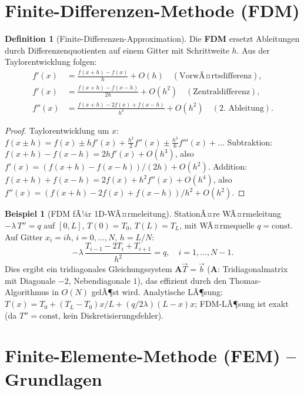 ﻿\documentclass[a4paper,12pt]{report}
\theoremstyle{definition}
\newtheorem{definition}{Definition}
\newtheorem{beispiel}{Beispiel}
\begin{document}

\section{Finite-Differenzen-Methode (FDM)}

\begin{definition}[Finite-Differenzen-Approximation]
Die \textbf{FDM} ersetzt Ableitungen durch Differenzenquotienten auf einem
Gitter mit Schrittweite $h$. Aus der Taylorentwicklung folgen:
\begin{align*}
  f'(x) &= \frac{f(x+h) - f(x)}{h} + O(h) \quad (\text{VorwÃ¤rtsdifferenz}),\\
  f'(x) &= \frac{f(x+h) - f(x-h)}{2h} + O(h^2) \quad (\text{Zentraldifferenz}),\\
  f''(x) &= \frac{f(x+h) - 2f(x) + f(x-h)}{h^2} + O(h^2) \quad (\text{2.\ Ableitung}).
\end{align*}
\end{definition}
\begin{proof}
Taylorentwicklung um $x$:
$f(x\pm h) = f(x) \pm hf'(x) + \tfrac{h^2}{2}f''(x) \pm \tfrac{h^3}{6}f'''(x) + \ldots$
Subtraktion: $f(x+h)-f(x-h) = 2hf'(x) + O(h^3)$, also $f'(x) = (f(x+h)-f(x-h))/(2h) + O(h^2)$.
Addition: $f(x+h)+f(x-h) = 2f(x) + h^2 f''(x) + O(h^4)$, also
$f''(x) = (f(x+h)-2f(x)+f(x-h))/h^2 + O(h^2)$.
\end{proof}

\begin{beispiel}[FDM fÃ¼r 1D-WÃ¤rmeleitung]
StationÃ¤re WÃ¤rmeleitung $-\lambda\,T'' = q$ auf $[0,L]$,
$T(0) = T_0$, $T(L) = T_L$, mit WÃ¤rmequelle $q = \mathrm{const}$.
Auf Gitter $x_i = ih$, $i = 0,\ldots,N$, $h = L/N$:
\[
  -\lambda\,\frac{T_{i-1} - 2T_i + T_{i+1}}{h^2} = q, \quad i = 1,\ldots,N-1.
\]
Dies ergibt ein tridiagonales Gleichungssystem $\mathbf{A}\vec{T} = \vec{b}$
($\mathbf{A}$: Tridiagonalmatrix mit Diagonale $-2$, Nebendiagonale $1$),
das effizient durch den Thomas-Algorithmus in $O(N)$ gelÃ¶st wird.
Analytische LÃ¶sung: $T(x) = T_0 + (T_L-T_0)x/L + (q/2\lambda)(L-x)x$;
FDM-LÃ¶sung ist exakt (da $T''=\mathrm{const}$, kein Diskretisierungsfehler).
\end{beispiel}

\section{Finite-Elemente-Methode (FEM) -- Grundlagen}
\end{document}

